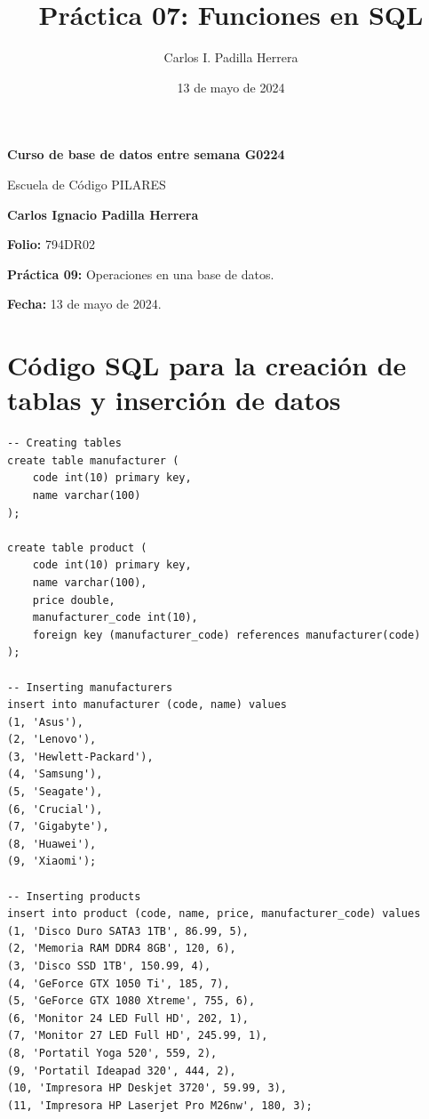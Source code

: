 \documentclass{article}
\title{Práctica 07: Funciones en SQL}
\author{Carlos I. Padilla Herrera}
\date{13 de mayo de 2024}
\begin{document}
\begin{titlepage}
    \centering
    \vspace*{1cm}
    \Huge\textbf{Curso de base de datos entre semana G0224}
    
    \vspace{0.5cm}
    \LARGE Escuela de Código PILARES
    
    \vspace{1.5cm}
    \textbf{Carlos Ignacio Padilla Herrera}
    
    \vspace{2cm}
    \Large\textbf{Folio:} 794DR02
    
    \vspace{0.5cm}
    \Large\textbf{Práctica 09:} Operaciones en una base de datos.
    
    \vfill
    
    \Large\textbf{Fecha:} 13 de mayo de 2024.
    
    \vspace{0.8cm}
\end{titlepage}

\newpage

\section*{Código SQL para la creación de tablas y inserción de datos}

\begin{lstlisting}
-- Creating tables
create table manufacturer (
    code int(10) primary key,
    name varchar(100)
);

create table product (
    code int(10) primary key,
    name varchar(100),
    price double,
    manufacturer_code int(10),
    foreign key (manufacturer_code) references manufacturer(code)
);

-- Inserting manufacturers
insert into manufacturer (code, name) values
(1, 'Asus'),
(2, 'Lenovo'),
(3, 'Hewlett-Packard'),
(4, 'Samsung'),
(5, 'Seagate'),
(6, 'Crucial'),
(7, 'Gigabyte'),
(8, 'Huawei'),
(9, 'Xiaomi');

-- Inserting products
insert into product (code, name, price, manufacturer_code) values
(1, 'Disco Duro SATA3 1TB', 86.99, 5),
(2, 'Memoria RAM DDR4 8GB', 120, 6),
(3, 'Disco SSD 1TB', 150.99, 4),
(4, 'GeForce GTX 1050 Ti', 185, 7),
(5, 'GeForce GTX 1080 Xtreme', 755, 6),
(6, 'Monitor 24 LED Full HD', 202, 1),
(7, 'Monitor 27 LED Full HD', 245.99, 1),
(8, 'Portatil Yoga 520', 559, 2),
(9, 'Portatil Ideapad 320', 444, 2),
(10, 'Impresora HP Deskjet 3720', 59.99, 3),
(11, 'Impresora HP Laserjet Pro M26nw', 180, 3);
\end{lstlisting}
\end{document}
